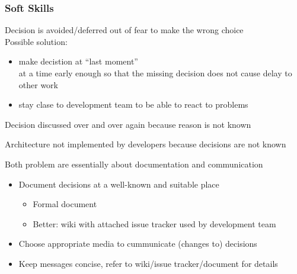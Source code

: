 \subsubsection*{Soft Skills}
\begin{defBox}[title=Fear of the wrong decision]
    Decision is avoided/deferred out of fear to make the wrong choice\\
    Possible solution:
    \begin{itemize}
        \item make decistion at \enquote{last  moment}\\
        at a time early enough so that the missing decision does not cause delay to other work
        \item stay clase to development team to be able to react to problems
    \end{itemize}
\end{defBox}
\begin{defBox}[title=Never ending discussions]
    Decision discussed over and over again because reason  is not known
\end{defBox}
\begin{defBox}[title=Architecture not implemented]
    Architecture not implemented by developers because decisions are not known
\end{defBox}
Both problem are essentially about documentation and communication
\begin{itemize}
    \item Document decisions at a well-known and suitable place
    \begin{itemize}
        \item Formal document
        \item Better: wiki with attached issue tracker used by development team
    \end{itemize}
    \item Choose appropriate media to cummunicate (changes to) decisions
    \item Keep messages concise, refer to wiki/issue tracker/document for details
\end{itemize}
